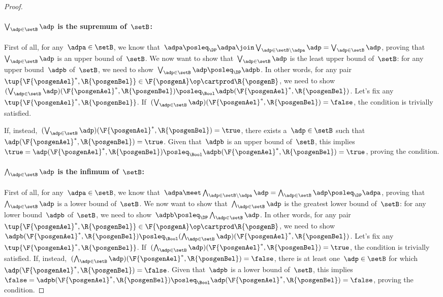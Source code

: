 \begin{proof}
    \paragraph*{$\bigvee_{\adp \in \setB} \adp$ is the supremum of~$\setB$:}
    First of all, for any~$\adpa\in \setB$, we know that~$\adpa\posleq_\DP \adpa \join \bigvee_{\adp \in \setB \backslash \adpa} \adp= \bigvee_{\adp \in \setB} \adp$, proving that~$\bigvee_{\adp \in \setB} \adp$ is an upper bound of~$\setB$.
    We now want to show that~$\bigvee_{\adp \in \setB} \adp$ is the least upper bound of~$\setB$: for any upper bound~$\adpb$ of~$\setB$, we need to show~$\bigvee_{\adp \in \setB} \adp \posleq_\DP\adpb$.
    In other words, for any pair~$\tup{\F{\posgenAel}^*,\R{\posgenBel}}\in \F{\posgenA}\op\cartprod \R{\posgenB}$, we need to show~$(\bigvee_{\adp \in \setB} \adp)(\F{\posgenAel}^*,\R{\posgenBel})\posleq_\Bool \adpb(\F{\posgenAel}^*,\R{\posgenBel})$.
    Let's fix any~$\tup{\F{\posgenAel}^*,\R{\posgenBel}}$.
    If~$(\bigvee_{\adp \in \setB} \adp)(\F{\posgenAel}^*,\R{\posgenBel})=\false$, the condition is trivially satisfied.
    
    If, instead,~$(\bigvee_{\adp \in \setB} \adp)(\F{\posgenAel}^*,\R{\posgenBel})=\true$, there exists a~$\adp\in \setB$ such that~$\adp(\F{\posgenAel}^*,\R{\posgenBel})=\true$.
    Given that~$\adpb$ is an upper bound of~$\setB$, this implies~$\true=\adp(\F{\posgenAel}^*,\R{\posgenBel})\posleq_\Bool \adpb(\F{\posgenAel}^*,\R{\posgenBel})=\true$, proving the condition.
    
    \paragraph*{$\bigwedge_{\adp \in \setB} \adp$ is the infimum of~$\setB$:}
    First of all, for any~$\adpa\in \setB$, we know that~$\adpa \meet \bigwedge_{\adp \in \setB \backslash \adpa} \adp= \bigwedge_{\adp \in \setB} \adp \posleq_\DP \adpa$, proving that~$\bigwedge_{\adp \in \setB} \adp$ is a lower bound of~$\setB$.
    We now want to show that~$\bigwedge_{\adp \in \setB} \adp$ is the greatest lower bound of~$\setB$: for any lower bound~$\adpb$ of~$\setB$, we need to show~$\adpb\posleq_\DP\bigwedge_{\adp \in \setB} \adp $.
    In other words, for any pair~$\tup{\F{\posgenAel}^*,\R{\posgenBel}}\in \F{\posgenA}\op\cartprod \R{\posgenB}$, we need to show~$\adpb(\F{\posgenAel}^*,\R{\posgenBel}) \posleq_\Bool (\bigwedge_{\adp \in \setB} \adp)(\F{\posgenAel}^*,\R{\posgenBel})$.
    Let's fix any~$\tup{\F{\posgenAel}^*,\R{\posgenBel}}$.
    If~$(\bigwedge_{\adp \in \setB} \adp)(\F{\posgenAel}^*,\R{\posgenBel})=\true$, the condition is trivially satisfied.
    If, instead,~$(\bigwedge_{\adp \in \setB} \adp)(\F{\posgenAel}^*,\R{\posgenBel})=\false$, there is at least one~$\adp\in \setB$ for which~$\adp(\F{\posgenAel}^*,\R{\posgenBel})=\false$.
    Given that~$\adpb$ is a lower bound of~$\setB$, this implies~$\false=\adpb(\F{\posgenAel}^*,\R{\posgenBel})\posleq_\Bool \adp(\F{\posgenAel}^*,\R{\posgenBel})=\false$, proving the condition.
\end{proof}


